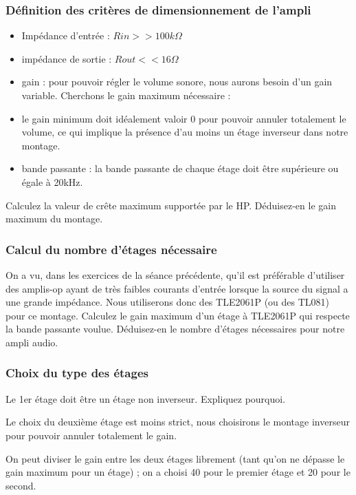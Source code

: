\documentclass{../template/labo}
\begin{document}
\subsubsection{Définition des critères de dimensionnement de l'ampli}

\begin{itemize}
\item Impédance d'entrée : $Rin >> 100k\Omega$
\item impédance de sortie : $Rout << 16\Omega$
\item gain : pour pouvoir régler le volume sonore, nous aurons besoin d'un gain variable. Cherchons le gain maximum nécessaire :
\item le gain minimum doit idéalement valoir 0 pour pouvoir annuler totalement le volume, ce qui implique la présence d'au moins un étage inverseur dans notre montage.
\item bande passante : la bande passante de chaque étage doit être supérieure ou égale à 20kHz.
\end{itemize}

\Question
{
Calculez la valeur de crête maximum supportée par le HP.
}
{}
\Question
{
Déduisez-en le gain maximum du montage.
}
{}

\subsubsection{Calcul du nombre d'étages nécessaire}
On a vu, dans les exercices de la séance précédente, qu'il est préférable d'utiliser des amplis-op ayant de très faibles courants d'entrée lorsque la source du signal a une grande impédance. Nous utiliserons donc des TLE2061P (ou des TL081) pour ce montage.
\Question
{
Calculez le gain maximum d'un étage à TLE2061P qui respecte la bande passante voulue.
}
{}
\Question
{
Déduisez-en le nombre d'étages nécessaires pour notre ampli audio.
}
{}


\subsubsection{Choix du type des étages}
\Question
{
Le 1er étage doit être un étage non inverseur. Expliquez pourquoi.
}
{}

Le choix du deuxième étage est moins strict, nous choisirons le montage inverseur pour pouvoir annuler totalement le gain.

On peut diviser le gain entre les deux étages librement (tant qu'on ne dépasse le gain maximum pour un étage) ; on a choisi 40 pour le premier étage et 20 pour le second.
\end{document}
